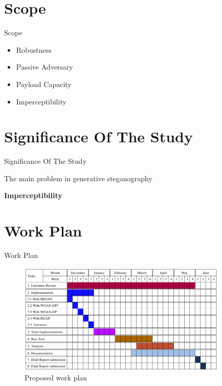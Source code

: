 \documentclass[11pt]{beamer}
\begin{document}
\section{Scope}
\begin{frame}{Scope} %

\begin{itemize}
	\item <1-> Robustness
	\item <2-> Passive Adversary
	\item <3-> Payload Capacity
	\item <4-> Imperceptibility
\end{itemize}
\end{frame}

\section{Significance Of The Study}
\begin{frame}{Significance Of The Study} %

	The main problem in generative steganography 
	
	\begin{center}
		\textbf{Imperceptibility}
	\end{center}
\end{frame}

\section{Work Plan}
\begin{frame}{Work Plan} %

\begin{figure}
	\includegraphics[width=10cm]{../images/workplan}
	\caption{Proposed work plan}
\end{figure}
\end{frame}
\end{document}
